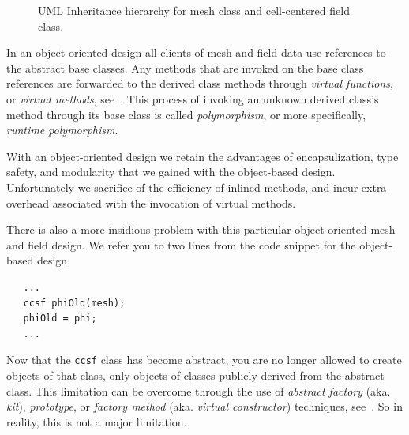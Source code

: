 \documentclass[reqno]{lanl}
\begin{document}
\begin{figure}
\caption{UML Inheritance hierarchy for mesh class
  and cell-centered field class.}
\label{fig:mesh_uml}
\end{figure}

In an object-oriented design all clients of mesh and field data use
references to the abstract base classes.
Any methods that are invoked on the base class references are forwarded
to the derived class methods through \emph{virtual functions},
 or \emph{virtual methods},
see~\cite{Cline99}.
This process of invoking an unknown derived class's method through its
base class is called \emph{polymorphism}, or more specifically, \emph{runtime
polymorphism}.

With an object-oriented design we retain the advantages of 
encapsulization, type safety, and modularity that we gained with the
object-based design.
Unfortunately we sacrifice of the efficiency of inlined methods,
and incur extra overhead associated with the invocation
of virtual methods.

There is also a more insidious problem with this particular object-oriented 
mesh and field design.
We refer you to two lines from the code snippet for the object-based design,
%
 \begin{verbatim}
   ...
   ccsf phiOld(mesh);
   phiOld = phi;
   ...
\end{verbatim} \normalcolor
%
Now that the \texttt{ccsf} class has become abstract, you
are no longer allowed to create objects of that class, only objects of
classes publicly derived from the abstract class.
This limitation can be overcome through the use of \emph{abstract factory}
(aka. \emph{kit}), \emph{prototype},
or \emph{factory method} (aka. \emph{virtual constructor})
techniques,
see~\cite{Gamma95}.
So in reality, this is not a major limitation.
\end{document}
